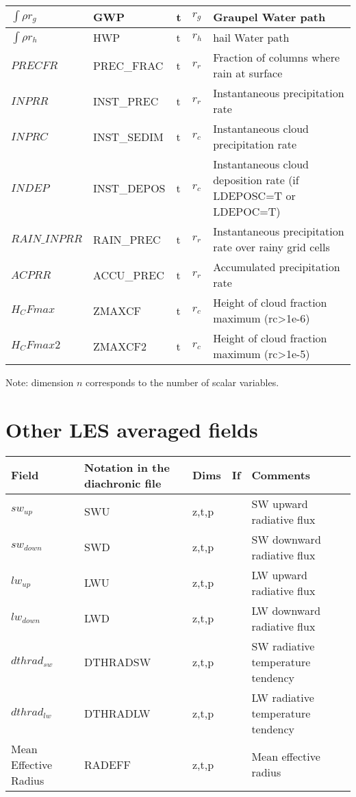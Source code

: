 \begin{longtable}[c]{|p{}|p{}|p{}|p{}|p{}|}
$\int{\rho r_g}$                & GWP         & t   & $r_g$ & Graupel Water path  \\\hline
$\int{\rho r_h}$                & HWP         & t   & $r_h$ & hail Water path  \\\hline
$PRECFR$                        & PREC\_FRAC  & t   & $r_r$ & Fraction of columns where rain at surface \\\hline
$INPRR$                         & INST\_PREC  & t   & $r_r$ & Instantaneous precipitation rate  \\\hline
$INPRC$                         & INST\_SEDIM & t   & $r_c$ & Instantaneous cloud precipitation rate  \\\hline
$INDEP$                         & INST\_DEPOS & t   & $r_c$ & Instantaneous cloud deposition rate (if LDEPOSC=T or LDEPOC=T) \\\hline
$RAIN\_INPRR$                   & RAIN\_PREC  & t   & $r_r$ & Instantaneous precipitation rate over rainy grid cells  \\\hline
$ACPRR$                         & ACCU\_PREC  & t   & $r_r$ & Accumulated precipitation rate  \\\hline
$H_CFmax$                       & ZMAXCF      & t   & $r_c$ & Height of cloud fraction maximum  (rc>1e-6) \\\hline
$H_CFmax2$                      & ZMAXCF2     & t   & $r_c$ & Height of cloud fraction maximum  (rc>1e-5) \\\hline
\end{longtable}
\endgroup

Note: dimension $n$ corresponds to the number of scalar variables.


\section{Other LES averaged fields}

\begingroup
\renewcommand\arraystretch{1.5}
\begin{longtable}[c]{|p{}|p{}|p{}|p{}|p{}|}
\hline
Field & Notation in the diachronic file & Dims & If  & Comments \\
\hline \hline
\endhead
$sw_{up}$             & SWU      & z,t,p & & SW upward radiative flux  \\\hline
$sw_{down}$           & SWD      & z,t,p & & SW downward radiative flux  \\\hline
$lw_{up}$             & LWU      & z,t,p & & LW upward radiative flux  \\\hline
$lw_{down}$           & LWD      & z,t,p & & LW downward radiative flux  \\\hline
$dthrad_{sw}$         & DTHRADSW & z,t,p & & SW radiative temperature tendency  \\\hline
$dthrad_{lw}$         & DTHRADLW & z,t,p & & LW radiative temperature tendency  \\\hline
Mean Effective Radius & RADEFF   & z,t,p & & Mean effective radius  \\\hline
\end{longtable}
\endgroup


